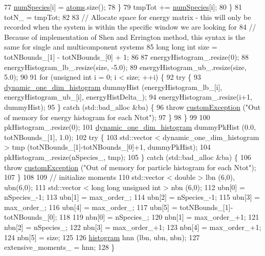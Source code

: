 \begin{DoxyCode}
77             \hyperlink{classsim_system_a9eea865e6dc1cff377b1e79c4d9c23f0}{numSpecies}[i] = \hyperlink{classsim_system_a90421b19082f7fb8fc23b7264b1161e4}{atoms}.size();
78         \}
79         tmpTot += \hyperlink{classsim_system_a9eea865e6dc1cff377b1e79c4d9c23f0}{numSpecies}[i];
80     \}
81     totN\_ = tmpTot;
82 
83     \textcolor{comment}{// Allocate space for energy matrix - this will only be recorded when the system is within the specific
       window we are looking for}
84     \textcolor{comment}{// Because of implementation of Shen and Errington method, this syntax is the same for single and
       multicomponent systems}
85     \textcolor{keywordtype}{long} \textcolor{keywordtype}{long} \textcolor{keywordtype}{int} size = totNBounds\_[1] - totNBounds\_[0] + 1;
86 
87     energyHistogram\_.resize(0);
88     energyHistogram\_lb\_.resize(size, -5.0);
89     energyHistogram\_ub\_.resize(size, 5.0);
90 
91     \textcolor{keywordflow}{for} (\textcolor{keywordtype}{unsigned} \textcolor{keywordtype}{int} i = 0; i < size; ++i) \{
92         \textcolor{keywordflow}{try} \{
93             \hyperlink{classdynamic__one__dim__histogram}{dynamic\_one\_dim\_histogram} dummyHist (energyHistogram\_lb\_[i], 
      energyHistogram\_ub\_[i], energyHistDelta\_);
94             energyHistogram\_.resize(i+1, dummyHist);
95         \} \textcolor{keywordflow}{catch} (std::bad\_alloc &ba) \{
96             \textcolor{keywordflow}{throw} \hyperlink{classcustom_exception}{customException} (\textcolor{stringliteral}{"Out of memory for energy histogram for each Ntot"});
97         \}
98     \}
99 
100     pkHistogram\_.resize(0);
101     \hyperlink{classdynamic__one__dim__histogram}{dynamic\_one\_dim\_histogram} dummyPkHist (0.0, totNBounds\_[1], 1.0);
102     \textcolor{keywordflow}{try} \{
103         std::vector < dynamic\_one\_dim\_histogram > tmp (totNBounds\_[1]-totNBounds\_[0]+1, dummyPkHist);
104         pkHistogram\_.resize(nSpecies\_, tmp);
105     \} \textcolor{keywordflow}{catch} (std::bad\_alloc &ba) \{
106         \textcolor{keywordflow}{throw} \hyperlink{classcustom_exception}{customException} (\textcolor{stringliteral}{"Out of memory for particle histogram for each Ntot"});
107     \}
108 
109     \textcolor{comment}{// initialize moments}
110     std::vector < double > lbn (6,0), ubn(6,0);
111     std::vector < long long unsigned int > nbn (6,0);
112     ubn[0] = nSpecies\_-1;
113     ubn[1] = max\_order\_;
114     ubn[2] = nSpecies\_-1;
115     ubn[3] = max\_order\_;
116     ubn[4] = max\_order\_;
117     ubn[5] = totNBounds\_[1]-totNBounds\_[0];
118 
119     nbn[0] = nSpecies\_;
120     nbn[1] = max\_order\_+1;
121     nbn[2] = nSpecies\_;
122     nbn[3] = max\_order\_+1;
123     nbn[4] = max\_order\_+1;
124     nbn[5] = size;
125 
126     \hyperlink{classhistogram}{histogram} hnn (lbn, ubn, nbn);
127     extensive\_moments\_ = hnn;
128 \}
\end{DoxyCode}
